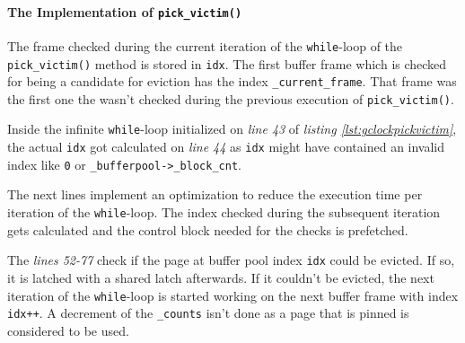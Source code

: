 \paragraph{The Implementation of \lstinline{pick_victim()}}

\begin{@empty}
    \lstset{
        language = [ISO]C++,
        style = basic
    }
    \begin{code}[ht!]
        \caption{Implementation of \lstinline{page_evictioner_gclock::pick_victim()}} \label{lst:gclockpickvictim}
        
    \end{code}
    \begin{code}[ht!]
        \ContinuedFloat
        \caption{Implementation of \lstinline{page_evictioner_gclock::pick_victim()} (cont.)}
        
    \end{code}
\end{@empty}

    The frame checked during the current iteration of the \lstinline{while}-loop of the \lstinline{pick_victim()} method is stored in \lstinline{idx}. The first buffer frame which is checked for being a candidate for eviction has the index \lstinline{_current_frame}. That frame was the first one the wasn't checked during the previous execution of \lstinline{pick_victim()}.

    Inside the infinite \lstinline{while}-loop initialized on \emph{line 43} of \emph{listing \ref{lst:gclockpickvictim}}, the actual \lstinline{idx} got calculated on \emph{line 44} as \lstinline{idx} might have contained an invalid index like \lstinline{0} or \lstinline{_bufferpool->_block_cnt}.

    The next lines implement an optimization to reduce the execution time per iteration of the \lstinline{while}-loop. The index checked during the subsequent iteration gets calculated and the control block needed for the checks is prefetched.

    The \emph{lines 52-77} check if the page at buffer pool index \lstinline{idx} could be evicted. If so, it is latched with a shared latch afterwards. If it couldn't be evicted, the next iteration of the \lstinline{while}-loop is started working on the next buffer frame with index \lstinline{idx++}. A decrement of the \lstinline{_counts} isn't done as a page that is pinned is considered to be used.


